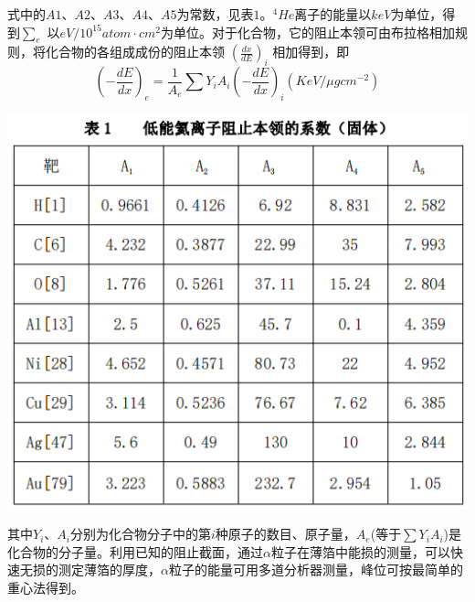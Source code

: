\documentclass[hyperref]{ctexart}
\begin{document}
\begin{multicols}{2}
	式中的$A1$、$A2$、$A3$、$A4$、$A5$为常数，见表$1$。$^{4}He$离子的能量以$keV$为单位，得到$\sum_e$ 以$eV/10^{15} atom\cdot{cm}^2$为单位。对于化合物，它的阻止本领可由布拉格相加规则，将化合物的各组成成份的阻止本领 $(\frac{dx}{dE})_i$ 相加得到，即
	\begin{equation}
	({-\frac{dE}{dx}})_e=\frac{1}{A_e}\sum Y_iA_i({-\frac{dE}{dx}})_i(KeV/\mu g{cm}^{-2})\label{fuhe}
	\end{equation}

	\begin{center}\includegraphics[scale=0.45]{biao1.png}\end{center}
	其中$ Y_i$、$A_i$分别为化合物分子中的第$i$种原子的数目、原子量，$A_e$(等于$\sum Y_iA_i$)是化合物的分子量。利用已知的阻止截面，通过$\alpha$粒子在薄箔中能损的测量，可以快速无损的测定薄箔的厚度，$\alpha$粒子的能量可用多道分析器测量，峰位可按最简单的重心法得到。

\end{multicols}
\end{document}
